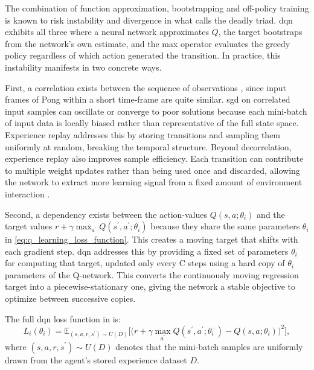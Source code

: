 The combination of function approximation, bootstrapping and off-policy training is known to risk instability and divergence in what \citet[p.~264]{suttonReinforcementLearningIntroduction2020} calls the deadly triad. \acrshort{dqn} exhibits all three where a neural network approximates $Q$, the target bootstraps from the network's own estimate, and the max operator evaluates the greedy policy regardless of which action generated the transition. In practice, this instability manifests in two concrete ways. 

First, a correlation exists between the sequence of observations \citep[p.~529]{mnihHumanlevelControlDeep2015}, since input frames of Pong within a short time-frame are quite similar. \acrshort{sgd} on correlated input samples can oscillate or converge to poor solutions because each mini-batch of input data is locally biased rather than representative of the full state space. Experience replay addresses this by storing transitions and sampling them uniformly at random, breaking the temporal structure. Beyond decorrelation, experience replay also improves sample efficiency. Each transition can contribute to multiple weight updates rather than being used once and discarded, allowing the network to extract more learning signal from a fixed amount of environment interaction \citep[p.~535]{mnihHumanlevelControlDeep2015}.

Second, a dependency exists between the action-values $Q(s,a;\theta_i)$ and the target values $r+\gamma \max_{a^{\prime}} Q\left(s^{\prime}, a^{\prime};\theta_i\right)$ because they share the same parameters $\theta_i$ in \eqref{eq:q_learning_loss_function}. This creates a moving target that shifts with each gradient step. \acrshort{dqn} addresses this by providing a fixed set of parameters $\theta_i^{\,\text{--}}$ for computing that target, updated only every C steps using a hard copy of $\theta_i$ parameters of the Q-network. This converts the continuously moving regression target into a piecewise-stationary one, giving the network a stable objective to optimize between successive copies.
	
The full \acrshort{dqn} loss function in \citet[p.~529]{mnihHumanlevelControlDeep2015} is:
\begin{equation}\label{eq:q_learning_loss_function_in_dqn}
	L_i\left(\theta_i\right) = \mathbb{E}_{(s, a, r, s^{\prime}) \sim U(D)} \Bigg[\bigg(r + \gamma \max_{a^{\prime}} Q(s^{\prime}, a^{\prime};\theta_i^{\,\text{--}}) - Q(s,a;\theta_i)\bigg)^2\Bigg],
\end{equation}
where $(s, a, r, s^{\prime}) \sim U(D)$ denotes that the mini-batch samples are uniformly drawn from the agent's stored experience dataset $D$.

